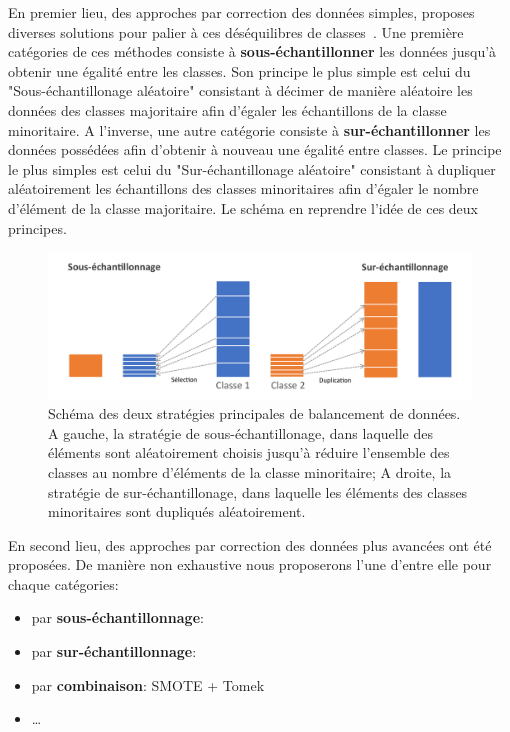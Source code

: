 En premier lieu, des approches par correction des données simples, proposes diverses solutions pour palier à ces déséquilibres de classes~\cite{Prati2009, He2009}. Une première catégories de ces méthodes consiste à \textbf{sous-échantillonner} les données jusqu'à obtenir une égalité entre les classes. Son principe le plus simple est celui du "Sous-échantillonage aléatoire" consistant à décimer de manière aléatoire les données des classes majoritaire afin d'égaler les échantillons de la classe minoritaire. A l'inverse, une autre catégorie consiste à \textbf{sur-échantillonner} les données possédées afin d'obtenir à nouveau une égalité entre classes. Le principe le plus simples est celui du "Sur-échantillonage aléatoire" consistant à dupliquer aléatoirement les échantillons des classes minoritaires afin d'égaler le nombre d'élément de la classe majoritaire. Le schéma en  reprendre l'idée de ces deux principes.\par

\begin{figure}[H]
    \centering
    \includegraphics[width=\linewidth]{contents/chapter_4/resources/scheme_data_balancing.pdf}
    \caption{Schéma des deux stratégies principales de balancement de données. A gauche, la stratégie de sous-échantillonage, dans laquelle des éléments sont aléatoirement choisis jusqu'à réduire l'ensemble des classes au nombre d'éléments de la classe minoritaire; A droite, la stratégie de sur-échantillonage, dans laquelle les éléments des classes minoritaires sont dupliqués aléatoirement. }
    \label{fig:scheme_data_balancing}
\end{figure}\par

En second lieu, des approches par correction des données plus avancées ont été proposées. De manière non exhaustive nous proposerons l'une d'entre elle pour chaque catégories:
\begin{itemize}
    \item par \textbf{sous-échantillonnage}: \cite{Tomek1976}
    \item par \textbf{sur-échantillonnage}:\cite{Chawla2002} 
    \item par \textbf{combinaison}: SMOTE + Tomek
    \item \ldots
\end{itemize}\par

